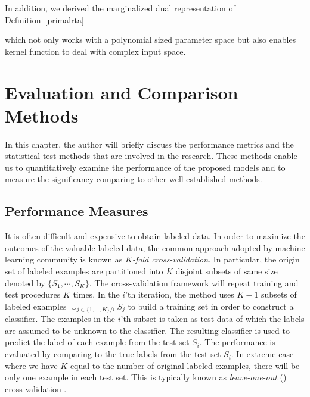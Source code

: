 {In addition, we derived the marginalized dual representation of Definition~\ref{primalrta}

which not only works with a polynomial sized parameter space but also enables kernel function to deal with complex input space.



%
\chapter{Evaluation and Comparison Methods} \label{ch_ecm}

In this chapter, the author will briefly discuss the performance metrics and the statistical test methods that are involved in the research. 
These methods enable us to quantitatively examine the performance of the proposed models and to measure the significancy comparing to other well established methods.

%
\section{Performance Measures} \label{sc_pm}

It is often difficult and expensive to obtain labeled data. 
In order to maximize the outcomes of the valuable labeled data, the common approach adopted by machine learning community is known as \textit{$K$-fold cross-validation}.
In particular, the origin set of labeled examples are partitioned into $K$ disjoint subsets of same size denoted by $\{S_1,\cdots,S_K\}$.
The cross-validation framework will repeat training and test procedures $K$ times.
In the $i$'th iteration, the method uses $K-1$ subsets of labeled examples $\cup_{j\in\{1,\cdots,K\}/i}S_j$ to build a training set in order to construct a classifier.
The examples in the $i$'th subset is taken as test data of which the labels are assumed to be unknown to the classifier.
The resulting classifier is used to predict the label of each example from the test set $S_i$.
The performance is evaluated by comparing to the true labels from the test set $S_i$.
In extreme case where we have $K$ equal to the number of original labeled examples, there will be only one example in each test set.
This is typically known as \textit{leave-one-out} (\loo) {cross-validation} .

}
